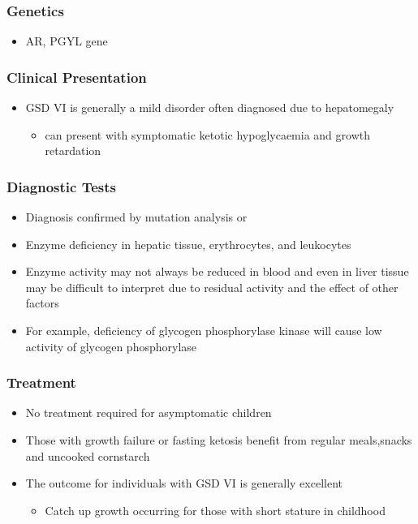 \documentclass{scrartcl}
\begin{document}
\subsubsection{Genetics}
\label{sec:orgee40af7}
\begin{itemize}
\item AR, PGYL gene
\end{itemize}

\subsubsection{Clinical Presentation}
\label{sec:orgbed2832}
\begin{itemize}
\item GSD VI is generally a mild disorder often diagnosed due to hepatomegaly
\begin{itemize}
\item can present with symptomatic ketotic hypoglycaemia and growth retardation
\end{itemize}
\end{itemize}
\subsubsection{Diagnostic Tests}
\label{sec:orgcf3ff9e}
\begin{itemize}
\item Diagnosis confirmed by mutation analysis or
\item Enzyme deficiency in hepatic tissue, erythrocytes, and leukocytes
\item Enzyme activity may not always be reduced in blood and even in liver
tissue may be difficult to interpret due to residual activity and
the effect of other factors
\item For example, deficiency of glycogen phosphorylase kinase will cause
low activity of glycogen phosphorylase
\end{itemize}
\subsubsection{Treatment}
\label{sec:orgc939a66}
\begin{itemize}
\item No treatment required for asymptomatic children
\item Those with growth failure or fasting ketosis benefit from regular
meals,snacks and uncooked cornstarch
\item The outcome for individuals with GSD VI is generally excellent
\begin{itemize}
\item Catch up growth occurring for those with short stature in childhood
\end{itemize}
\end{itemize}
\end{document}
